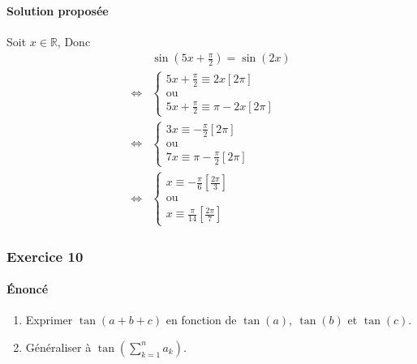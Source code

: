 \documentclass[10pt]{article}
\newcommand{\pr}[1]{\left(#1\right)}
\def\R{\mathbb R}
\def\Ssi{\Longleftrightarrow}
\begin{document}
    \paragraph{Solution proposée} Soit $x\in\R$,
    Donc
    \begin{align*}
        &\sin\pr{5x+\frac\pi2}=\sin(2x)\\
        \Ssi&\begin{cases}5x+\frac\pi2\equiv 2x[2\pi]\\ \text{ou}\\5x+\frac\pi2\equiv\pi- 2x[2\pi] \end{cases}\\
        \Ssi&\begin{cases}3x\equiv-\frac\pi2[2\pi]\\ \text{ou}\\7x\equiv\pi-\frac\pi2[2\pi] \end{cases}\\
        \Ssi&\begin{cases}x\equiv-\frac\pi6\left[\frac{2\pi}3\right]\\\text{ou}\\x\equiv\frac\pi{14}\left[\frac{2\pi}7\right] \end{cases}
    \end{align*}

    \subsubsection*{Exercice 10}
    \paragraph{Énoncé} 
    \begin{enumerate}
        \item Exprimer $\tan(a+b+c)$ en fonction de $\tan(a),\ \tan(b)$ et $\tan(c)$.
        \item Généraliser à $\tan\left(\sum_{k=1}^na_k\right)$.
    \end{enumerate}
    
\end{document}
